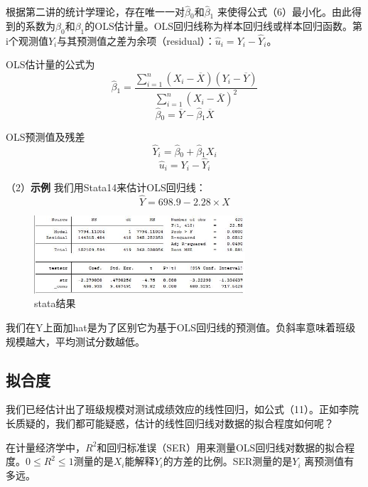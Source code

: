 \documentclass[cn,10pt,math=newtx,citestyle=gb7714-2015,bibstyle=gb7714-2015]{elegantbook}
\begin{document}
	根据第二讲的统计学理论，存在唯一一对$\hat\beta{_0}$和$\hat\beta{_1}$ 来使得公式（6）最小化。由此得到的系数为$\beta_0$和$\beta_1$的OLS估计量。OLS回归线称为样本回归线或样本回归函数。第i个观测值$Y_i$与其预测值之差为余项（residual）：$\hat{u}_i=Y_i-\hat{Y}_i$。
	
	OLS估计量的公式为
	\begin{equation}
		\hat\beta{_1}=\frac{\sum_{i=1}^n{(X_i-\overline{X})(Y_i-\overline{Y})}}{\sum_{i=1}^n{(X_i-\overline{X})^2}}
	\end{equation}
	\begin{equation}
		\hat\beta{_0}=\overline{Y}-\hat\beta{_1}\overline{X}
	\end{equation}
	
	OLS预测值及残差
	\begin{equation}
		\hat{Y}_i=\hat\beta{_0}+\hat\beta{_1}X_i
	\end{equation}
	\begin{equation}
		\hat{u}_i=Y_i-\hat{Y}_i
	\end{equation}
	
	（2）\textbf{示例}
	我们用Stata14来估计OLS回归线：
	\begin{equation}
		\hat{Y}=698.9-2.28\times{X}
	\end{equation}
	\begin{figure}[htbp]
		\centering
		\includegraphics[width=0.7\textwidth]{stata1.jpg}
		\caption{stata结果}\label{fig:digit}
	\end{figure}
	
	我们在Y上面加hat是为了区别它为基于OLS回归线的预测值。负斜率意味着班级规模越大，平均测试分数越低。
	\subsection{拟合度}
	我们已经估计出了班级规模对测试成绩效应的线性回归，如公式（11）。正如李院长质疑的，我们都可能疑惑，估计的线性回归线对数据的拟合程度如何呢？
	
	在计量经济学中，$R^2$和回归标准误（SER）用来测量OLS回归线对数据的拟合程度。$0\leq{R^2}\leq1$测量的是$X_i$能解释$Y_i$的方差的比例。SER测量的是$Y_i$ 离预测值有多远。
	
\end{document}

